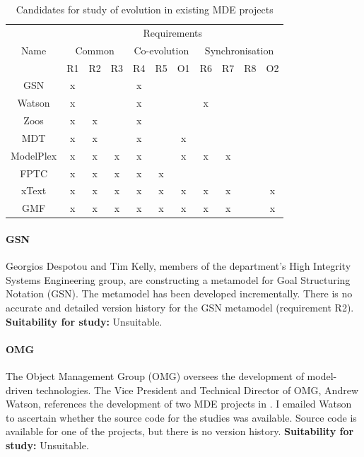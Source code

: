 \begin{table}
	\caption{Candidates for study of evolution in existing MDE projects}
	\centering
	\begin{tabular}{|c||c|c|c||c|c|c||c|c|c|c|}
		\hline
		\multirow{3}{*}{Name} & \multicolumn{10}{|c|}{Requirements} \\
		\cline{2-11}
		          & \multicolumn{3}{|c||}{Common} & \multicolumn{3}{|c||}{Co-evolution} & \multicolumn{4}{|c|}{Synchronisation} \\
		\cline{2-11}
		          & R1 & R2 & R3 & R4 & R5 & O1 & R6 & R7 & R8 & O2 \\
		\hline
		GSN       & x  &    &    & x  &    &    &    &    &    &    \\
		\hline
		Watson    & x  &    &    & x  &    &    & x  &    &    &    \\
		\hline
		Zoos      & x  & x  &    & x  &    &    &    &    &    &    \\
		\hline
		MDT       & x  & x  &    & x  &    & x  &    &    &    &    \\
		\hline
		ModelPlex & x  & x  & x  & x  &    & x  & x  & x  &    &    \\
		\hline
		FPTC      & x  & x  & x  & x  & x  &    &    &    &    &    \\
		\hline
		xText     & x  & x  & x  & x  & x  & x  & x  & x  &    & x  \\
		\hline
		GMF       & x  & x  & x  & x  & x  & x  & x  & x  &    & x  \\
		\hline
	\end{tabular}
	\label{tab:candidates}
\end{table}

\paragraph{GSN} %
\label{par:gsn}
Georgios Despotou and Tim Kelly, members of the department's High Integrity Systems Engineering group, are constructing a metamodel for Goal Structuring Notation (GSN). The metamodel has been developed incrementally. There is no accurate and detailed version history for the GSN metamodel (requirement R2). \textbf{Suitability for study:} Unsuitable.

\paragraph{OMG} %
\label{par:omg}
The Object Management Group (OMG) \cite{omg} oversees the development of model-driven technologies. The Vice President and Technical Director of OMG, Andrew Watson, references the development of two MDE projects in \cite{watson08mdahistory}. I emailed Watson to ascertain whether the source code for the studies was available. Source code is available for one of the projects, but there is no version history. \textbf{Suitability for study:} Unsuitable.

